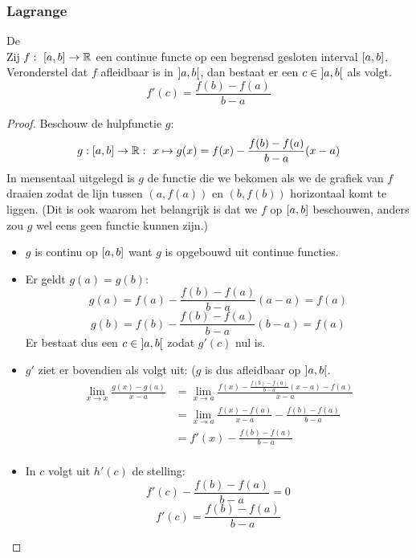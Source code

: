 \documentclass[main.tex]{subfiles}
\begin{document}
\subsubsection{Lagrange}
\label{sec:middelwaardestelling-lagrange}

\begin{bst}
  \label{st:middelwaardestelling-lagrange}
  De \\
  Zij $f:\ \interval{a}{b} \rightarrow \mathbb{R}$ een continue functe op een begrensd gesloten interval $\interval{a}{b}$.
  Veronderstel dat $f$ afleidbaar is in $\interval[open]{a}{b}$, dan bestaat er een $c\in \interval[open]{a}{b}$ als volgt.
  \[ f'(c) = \frac{f(b)-f(a)}{b-a} \]

  \begin{proof}
   Beschouw de hulpfunctie $g$:
   \[ g: \interval{a}{b} \rightarrow \mathbb{R}:\ x \mapsto g(x) = f(x)-\frac{f(b)-f(a)}{b-a}(x-a) \]
   In mensentaal uitgelegd is $g$ de functie die we bekomen als we de grafiek van $f$ draaien zodat de lijn tussen $(a,f(a))$ en $(b,f(b))$ horizontaal komt te liggen. (Dit is ook waarom het belangrijk is dat we $f$ op $\interval{a}{b}$ beschouwen, anders zou $g$ wel eens geen functie kunnen zijn.)
   \begin{itemize}
   \item $g$ is continu op $\interval{a}{b}$ want $g$ is opgebouwd uit continue functies.
   \item Er geldt $g(a) = g(b)$:
     \[ g(a) = f(a)-\frac{f(b)-f(a)}{b-a}(a-a) = f(a) \]
     \[ g(b) = f(b)-\frac{f(b)-f(a)}{b-a}(b-a) = f(a) \]
     Er bestaat dus een $c\in \interval[open]{a}{b}$ zodat $g'(c)$ nul is.
   \item $g'$ ziet er bovendien als volgt uit: ($g$ is dus afleidbaar op $\interval[open]{a}{b}$.
     \[
     \begin{array}{rl}
       \lim_{x \rightarrow x}\frac{g(x)-g(a)}{x-a}
       &= \lim_{x \rightarrow a}\frac{f(x)-\frac{f(b)-f(a)}{b-a}(x-a) - f(a)}{x-a}\\
       &= \lim_{x \rightarrow a} \frac{f(x)-f(a)}{x-a} - \frac{f(b)-f(a)}{b-a}\\
       &= f'(x)-\frac{f(b)-f(a)}{b-a}\\
     \end{array}
     \]
   \item  In $c$ volgt uit $h'(c)$ de stelling:
     \[
     f'(c)-\frac{f(b)-f(a)}{b-a} = 0 
     \]
     \[
     f'(c) = \frac{f(b)-f(a)}{b-a} 
     \]
   \end{itemize}
  \end{proof}
\feed
\end{bst}
\end{document}
